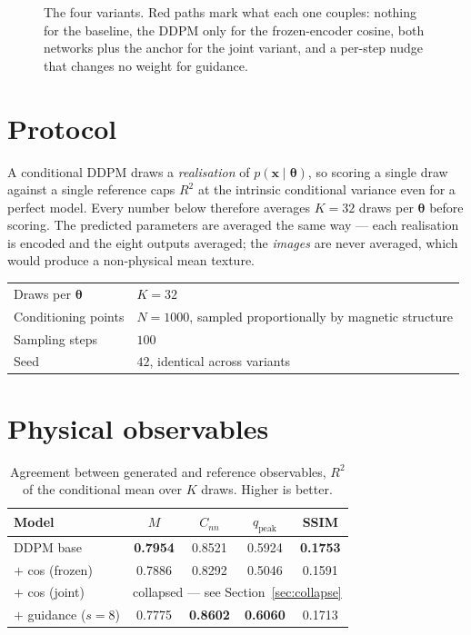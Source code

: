 \documentclass[11pt,a4paper]{article}
\newcommand{\best}[1]{\textbf{#1}}
\newcommand{\warn}[1]{\textcolor{red!70!black}{#1}}
\begin{document}
\begin{figure}[htbp]
  \centering
  \resizebox{\textwidth}{!}{}
  \caption{The four variants. Red paths mark what each one couples: nothing for the
  baseline, the DDPM only for the frozen-encoder cosine, both networks plus the anchor
  for the joint variant, and a per-step nudge that changes no weight for guidance.}
\end{figure}

\section{Protocol}

A conditional DDPM draws a \emph{realisation} of $p(\mathbf{x}\mid\bm\theta)$, so scoring a
single draw against a single reference caps $R^{2}$ at the intrinsic conditional
variance even for a perfect model. Every number below therefore averages $K=32$ draws
per $\bm\theta$ before scoring. The predicted parameters are averaged the same way ---
each realisation is encoded and the eight outputs averaged; the \emph{images} are never
averaged, which would produce a non-physical mean texture.

\begin{center}\small
\begin{tabular}{ll}
\toprule
Draws per $\bm\theta$ & $K=32$ \\
Conditioning points & $N=1000$, sampled proportionally by magnetic structure \\
Sampling steps & $100$ \\
Seed & $42$, identical across variants \\
\bottomrule
\end{tabular}
\end{center}

\section{Physical observables}

\begin{table}[htbp]
\centering
\caption{Agreement between generated and reference observables, $R^{2}$ of the
conditional mean over $K$ draws. Higher is better.}
\begin{tabular}{lcccc}
\toprule
Model & $M$ & $C_{nn}$ & $q_{\mathrm{peak}}$ & SSIM \\
\midrule
DDPM base            & \best{0.7954} & 0.8521        & 0.5924        & \best{0.1753} \\
$+$ cos (frozen)     & 0.7886        & 0.8292        & 0.5046        & 0.1591 \\
$+$ cos (joint)      & \multicolumn{4}{c}{\warn{collapsed --- see Section~\ref{sec:collapse}}} \\
$+$ guidance ($s=8$) & 0.7775        & \best{0.8602} & \best{0.6060} & 0.1713 \\
\bottomrule
\end{tabular}
\end{table}
\end{document}
